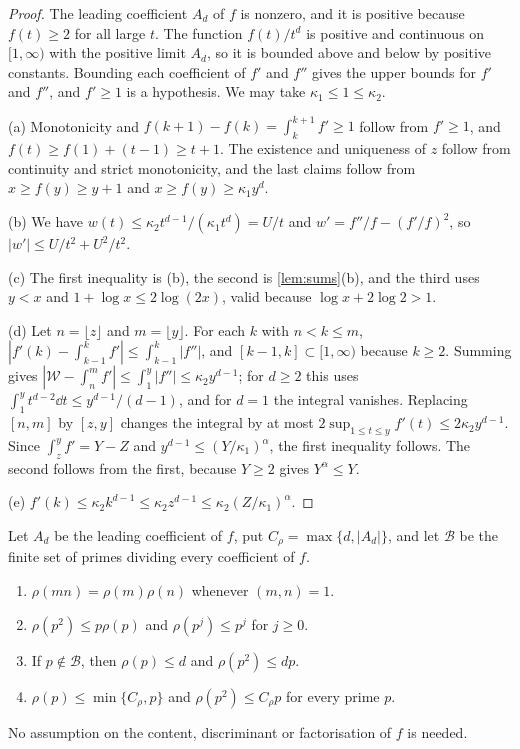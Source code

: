 \begin{proof}
The leading coefficient $A_d$ of $f$ is nonzero, and it is positive because $f(t)\ge2$ for all large $t$. The function $f(t)/t^d$ is positive and continuous on $[1,\infty)$ with the positive limit $A_d$, so it is bounded above and below by positive constants. Bounding each coefficient of $f'$ and $f''$ gives the upper bounds for $f'$ and $f''$, and $f'\ge1$ is a hypothesis. We may take $\kappa_1\le1\le\kappa_2$.

(a) Monotonicity and $f(k+1)-f(k)=\int_k^{k+1}f'\ge1$ follow from $f'\ge1$, and $f(t)\ge f(1)+(t-1)\ge t+1$. The existence and uniqueness of $z$ follow from continuity and strict monotonicity, and the last claims follow from $x\ge f(y)\ge y+1$ and $x\ge f(y)\ge\kappa_1y^d$.

(b) We have $w(t)\le\kappa_2t^{d-1}/(\kappa_1t^d)=U/t$ and $w'=f''/f-(f'/f)^2$, so $|w'|\le U/t^2+U^2/t^2$.

(c) The first inequality is (b), the second is \cref{lem:sums}(b), and the third uses $y<x$ and $1+\log x\le2\log(2x)$, valid because $\log x+2\log2>1$.

(d) Let $n=\lfloor z\rfloor$ and $m=\lfloor y\rfloor$. For each $k$ with $n<k\le m$, $|f'(k)-\int_{k-1}^kf'|\le\int_{k-1}^k|f''|$, and $[k-1,k]\subset[1,\infty)$ because $k\ge2$. Summing gives $|\mathcal W-\int_n^mf'|\le\int_1^y|f''|\le\kappa_2y^{d-1}$; for $d\ge2$ this uses $\int_1^yt^{d-2}\dd t\le y^{d-1}/(d-1)$, and for $d=1$ the integral vanishes. Replacing $[n,m]$ by $[z,y]$ changes the integral by at most $2\sup_{1\le t\le y}f'(t)\le2\kappa_2y^{d-1}$. Since $\int_z^yf'=Y-Z$ and $y^{d-1}\le(Y/\kappa_1)^{\alpha}$, the first inequality follows. The second follows from the first, because $Y\ge2$ gives $Y^\alpha\le Y$.

(e) $f'(k)\le\kappa_2k^{d-1}\le\kappa_2z^{d-1}\le\kappa_2(Z/\kappa_1)^{\alpha}$.
\end{proof}

\begin{lemma}\label{lem:rho}
Let $A_d$ be the leading coefficient of $f$, put $C_\rho=\max\{d,|A_d|\}$, and let $\mathcal B$ be the finite set of primes dividing every coefficient of $f$.
\begin{enumerate}[label=(\alph*)]
\item $\rho(mn)=\rho(m)\rho(n)$ whenever $(m,n)=1$.
\item $\rho(p^2)\le p\rho(p)$ and $\rho(p^j)\le p^j$ for $j\ge0$.
\item If $p\notin\mathcal B$, then $\rho(p)\le d$ and $\rho(p^2)\le dp$.
\item $\rho(p)\le\min\{C_\rho,p\}$ and $\rho(p^2)\le C_\rho p$ for every prime $p$.
\end{enumerate}
No assumption on the content, discriminant or factorisation of $f$ is needed.
\end{lemma}

